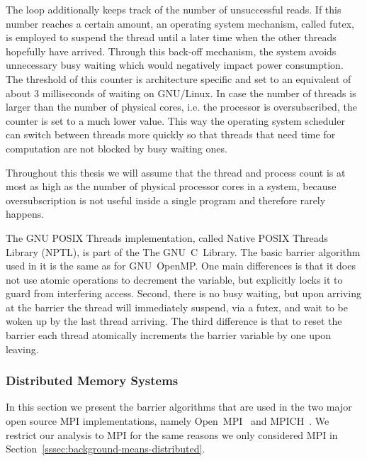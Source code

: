 \documentclass[a4paper, 10pt]{article}
\begin{document}
The loop additionally keeps track of the number of unsuccessful reads. If this number reaches a certain amount, an operating system mechanism, called futex\cite{franke2002}, is employed to suspend the thread until a later time when the other threads hopefully have arrived. Through this back-off mechanism, the system avoids unnecessary busy waiting which would negatively impact power consumption. The threshold of this counter is architecture specific and set to an equivalent of about 3 milliseconds of waiting on GNU/Linux. In case the number of threads is larger than the number of physical cores, i.e. the processor is oversubscribed, the counter is set to a much lower value. This way the operating system scheduler can switch between threads more quickly so that threads that need time for computation are not blocked by busy waiting ones.

Throughout this thesis we will assume that the thread and process count is at most as high as the number of physical processor cores in a system, because oversubscription is not useful inside a single program and therefore rarely happens.

The GNU POSIX Threads implementation, called Native POSIX Threads Library (NPTL), is part of the The GNU~C~Library.
The basic barrier algorithm used in it is the same as for GNU~OpenMP. One main differences is that it does not use atomic operations to decrement the variable, but explicitly locks it to guard from interfering access. Second, there is no busy waiting, but upon arriving at the barrier the thread will immediately suspend, via a futex, and wait to be woken up by the last thread arriving. The third difference is that to reset the barrier each thread atomically increments the barrier variable by one upon leaving.

\subsubsection{Distributed Memory Systems}
\label{sssec:background-current-distributed}

In this section we present the barrier algorithms that are used in the two major open source MPI implementations, namely Open~MPI~\cite{openmpi} and MPICH~\cite{mpich}. We restrict our analysis to MPI for the same reasons we only considered MPI in Section~\ref{sssec:background-means-distributed}.
\end{document}
